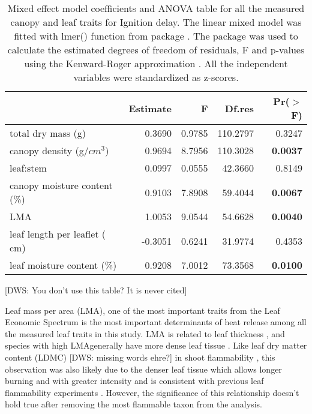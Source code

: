 \documentclass[12pt]{report}
\begin{document}
\begin{table}[ht]
\centering
\caption{Mixed effect model coefficients and ANOVA table for all the measured canopy and leaf traits for Ignition delay. The linear mixed model was fitted with lmer() function from  package \citep{bates2009package}. The  package \citep{fox2013hypothesis} was used to calculate the estimated degrees of freedom of residuals, F and p-values using the Kenward-Roger approximation \citep{kenward1997small}. All the independent variables were standardized  as z-scores.}
\vspace{0.2\,cm}
\begin{tabular}{lrrrr}
  \hline
 & Estimate & F & Df.res & Pr($>$F) \\ 
  \hline 
  total dry mass (g) & 0.3690  & 0.9785  & 110.2797 & 0.3247 \\ 
  canopy density (g/{$cm^3$}) & 0.9694 & 8.7956  & 110.3028 & \textbf{0.0037} \\ 
  leaf:stem & 0.0997 & 0.0555  & 42.3660 & 0.8149 \\ 
  canopy moisture content (\%) & 0.9103 & 7.8908 & 59.4044 & \textbf{0.0067} \\ 
  LMA & 1.0053 & 9.0544  & 54.6628 & \textbf{0.0040} \\ 
  leaf length per leaflet (\,cm) & -0.3051 & 0.6241 & 31.9774 & 0.4353 \\ 
  leaf moisture content (\%) & 0.9208 & 7.0012  & 73.3568 & \textbf{0.0100} \\ 
  \hline
\end{tabular}
\end{table}


[DWS: You don't use this table? It is never cited]


Leaf mass per area (LMA), one of the most important traits from the Leaf Economic Spectrum \citep{wright2004worldwide} is the most important determinants of heat release among all the measured leaf traits in this study. LMA is related to leaf thickness \citep{niinemets1999research}, and species with high LMAgenerally have more dense leaf tissue \citep{poorter2009causes}. Like leaf dry matter content (LDMC) [DWS: missing words ehre?]  in shoot flammability \citep{alam2020shoot, potts2022growth}, this observation was also likely due to the denser leaf tissue which allows longer burning and with greater intensity and is consistent with previous leaf flammability experiments \citep{krix2018landscape}. However, the significance of this relationship doesn’t hold true after removing the most flammable taxon from the analysis. 
\end{document}
